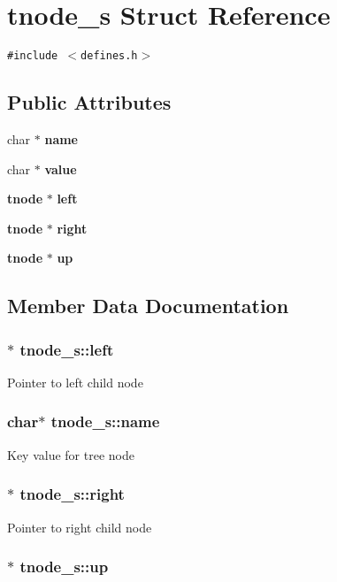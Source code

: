 \section{tnode\_\-s  Struct Reference}
\label{structtnode__s}
{\tt \#include $<$defines.h$>$}

\subsection*{Public Attributes}
\begin{CompactItemize}
\item 
char $\ast$ {\bf name}
\item 
char $\ast$ {\bf value}
\item 
{\bf tnode} $\ast$ {\bf left}
\item 
{\bf tnode} $\ast$ {\bf right}
\item 
{\bf tnode} $\ast$ {\bf up}
\end{CompactItemize}


\subsection{Member Data Documentation}
\subsubsection{$\ast$ tnode\_\-s::left}\label{structtnode__s_m2}


Pointer to left child node 
\subsubsection{\setlength{\rightskip}{0pt plus 5cm}char$\ast$ tnode\_\-s::name}\label{structtnode__s_m0}


Key value for tree node 
\subsubsection{$\ast$ tnode\_\-s::right}\label{structtnode__s_m3}


Pointer to right child node 
\subsubsection{$\ast$ tnode\_\-s::up}\label{structtnode__s_m4}


